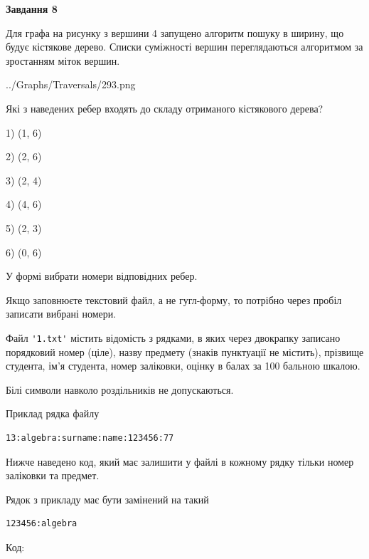 \documentclass[12pt, ukrainian]{article}
\def\code#1{\Verb!#1!}
\begin{document}
{\begin {large}
{\begin {center}\textbf{Завдання 8}\end {center}}\par
Для графа на рисунку з вершини 4 запущено алгоритм пошуку в ширину, що будує кістякове дерево. Списки суміжності вершин переглядаються алгоритмом за зростанням міток вершин.\par
\begin{center}
	{../Graphs/Traversals/293.png}
\end{center}
\par Які з наведених ребер входять до складу отриманого кістякового дерева?\par
1) (1, 6)\par
2) (2, 6)\par
3) (2, 4)\par
4) (4, 6)\par
5) (2, 3)\par
6) (0, 6)\par
{\vskip 15pt} У формі вибрати номери відповідних ребер.


Якщо заповнюєте текстовий файл, а не гугл-форму, то потрібно через пробіл записа\-ти вибрані номери.\par
\newpage


Файл \code{'1.txt'} містить відомість з рядками, в яких через двокрапку записано поряд\-ковий номер (ціле), назву предмету (знаків пунктуації не містить), прізвище студента, ім'я студента, номер заліковки, оцінку в балах за 100 бальною шкалою.

Білі символи навколо роздільників не допускаються.

Приклад рядка файлу



\begin{verbatim}
13:algebra:surname:name:123456:77
\end{verbatim}


Нижче наведено код, який має залишити у файлі в кожному рядку тільки номер заліковки та предмет.

Рядок з прикладу має бути замінений на такий



\begin{verbatim}
123456:algebra
\end{verbatim}




Код:




\end{large}}
\end{document}
